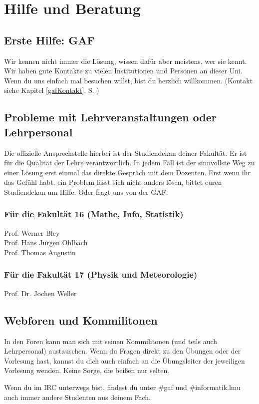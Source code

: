 ﻿\chapter{Hilfe und Beratung}

\section{Erste Hilfe: GAF}

Wir kennen nicht immer die Lösung, wissen dafür aber meistens, wer sie
kennt. Wir haben gute Kontakte zu vielen Institutionen und Personen an
dieser Uni. Wenn du uns einfach mal besuchen willst, bist du herzlich
willkommen. (Kontakt siehe Kapitel \ref{gafKontakt}, S. \pageref{gafKontakt})

\section{Probleme mit Lehrveranstaltungen oder Lehrpersonal}

Die offizielle Ansprechstelle hierbei ist der Studiendekan deiner
Fakultät. Er ist für die Qualität der Lehre verantwortlich. In jedem
Fall ist der sinnvollste Weg zu einer Lösung erst einmal das direkte
Gespräch mit dem Dozenten. Erst wenn ihr das Gefühl habt, ein Problem
lässt sich nicht anders lösen, bittet euren Studiendekan um
Hilfe. Oder fragt uns von der GAF.

\subsection*{Für die Fakultät 16 (Mathe, Info, Statistik)}
Prof. Werner Bley\\ %
Prof. Hans Jürgen Ohlbach\\
Prof. Thomas Augustin %

\subsection*{Für die Fakultät 17 (Physik und Meteorologie)}
Prof. Dr. Jochen Weller

\section{Webforen und Kommilitonen}

In den Foren kann man sich mit seinen Kommilitonen
(und teils auch Lehrpersonal) austauschen. Wenn du Fragen direkt zu den
Übungen oder der Vorlesung hast, kannst du dich auch einfach an die
Übungsleiter der jeweiligen Vorlesung wenden. Keine Sorge, die beißen nur
selten.
\begin{urlList}
\end{urlList}
Wenn du im IRC unterwegs bist, findest du unter \#gaf und \#informatik.lmu
auch immer andere Studenten aus deinem Fach.

